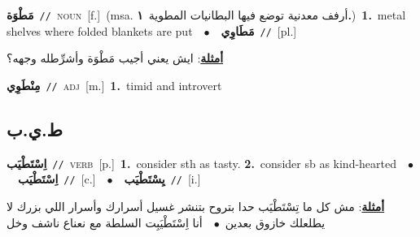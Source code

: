 \documentclass[10pt,a4paper,twoside]{article} %
\begin{document}
\begin{multicols}{2}
{\setlength\topsep{0pt}\textbf{\foreignlanguage{arabic}{مَطْوَة}}\ {\color{gray}\texttt{//}\color{black}}\ \textsc{noun}\ [f.]\ \color{gray}(msa. \foreignlanguage{arabic}{أرفف معدنية توضع فيها البطانيات المطوية}~\foreignlanguage{arabic}{\textbf{١.}})\color{black}\ \textbf{1.}~metal shelves where folded blankets are put\ \ $\bullet$\ \ \setlength\topsep{0pt}\textbf{\foreignlanguage{arabic}{مَطَاوِي}}\ {\color{gray}\texttt{//}\color{black}}\ [pl.]\  \begin{flushright}\color{gray}\foreignlanguage{arabic}{\textbf{\underline{\foreignlanguage{arabic}{أمثلة}}}: ايش يعني أجيب مَطْوَة وأشرِّطله وجهه؟}\end{flushright}\color{black}} \vspace{2mm}

{\setlength\topsep{0pt}\textbf{\foreignlanguage{arabic}{مِنْطَوِي}}\ {\color{gray}\texttt{//}\color{black}}\ \textsc{adj}\ [m.]\ \textbf{1.}~timid and introvert\ } \vspace{2mm}

\vspace{-3mm}
\subsection*{\color{blue}\foreignlanguage{arabic}{ط.ي.ب}\color{blue}{}} 

{\setlength\topsep{0pt}\textbf{\foreignlanguage{arabic}{اِسْتَطْيَب}}\ {\color{gray}\texttt{//}\color{black}}\ \textsc{verb}\ [p.]\ \textbf{1.}~consider sth as tasty.  \textbf{2.}~consider sb as kind-hearted\ \ $\bullet$\ \ \setlength\topsep{0pt}\textbf{\foreignlanguage{arabic}{اِسْتَطْيَب}}\ {\color{gray}\texttt{//}\color{black}}\ [c.]\ \ $\bullet$\ \ \setlength\topsep{0pt}\textbf{\foreignlanguage{arabic}{يِسْتَطْيَب}}\ {\color{gray}\texttt{//}\color{black}}\ [i.]\  \begin{flushright}\color{gray}\foreignlanguage{arabic}{\textbf{\underline{\foreignlanguage{arabic}{أمثلة}}}: مش كل ما تِسْتَطْيَب حدا بتروح بتنشر غسيل أسرارك وأسرار اللي بزرك لا يطلعلك خازوق بعدين\ $\bullet$\ \  أنا اِسْتَطْيَبِت السلطة مع نعناع ناشف وخل}\end{flushright}\color{black}} \vspace{2mm}


\end{multicols}
\end{document}

